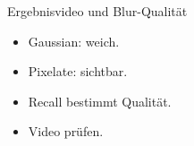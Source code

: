\begin{frame}{Ergebnisvideo und Blur-Qualität}
\begin{itemize}
    \item Gaussian: weich.
    \item Pixelate: sichtbar.
    \item Recall bestimmt Qualität.
    \item Video prüfen.
\end{itemize}
\end{frame}
